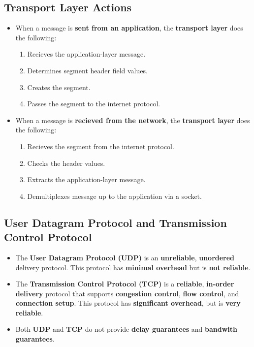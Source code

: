 \documentclass{article}
\begin{document}
    \subsection*{Transport Layer Actions}
    \begin{itemize}
        \item When a message is \textbf{sent from an application}, the \textbf{transport layer} does the following:
        \begin{enumerate}
            \item Recieves the application-layer message.
            \item Determines segment header field values.
            \item Creates the segment.
            \item Passes the segment to the internet protocol.
        \end{enumerate}
        \item When a message is \textbf{recieved from the network}, the \textbf{transport layer} does the following:
        \begin{enumerate}
            \item Recieves the segment from the internet protocol.
            \item Checks the header values.
            \item Extracts the application-layer message.
            \item Demultiplexes message up to the application via a socket.
        \end{enumerate}
    \end{itemize}

    \subsection*{User Datagram Protocol and Transmission Control Protocol}
    \begin{itemize}
        \item The \textbf{User Datagram Protocol (UDP)} is an \textbf{unreliable}, \textbf{unordered} delivery protocol. This protocol has \textbf{minimal overhead} but is \textbf{not reliable}.
        \item The \textbf{Transmission Control Protocol (TCP)} is a \textbf{reliable}, \textbf{in-order delivery} protocol that supports \textbf{congestion control}, \textbf{flow control}, and \textbf{connection setup}. This protocol has \textbf{significant overhead}, but is \textbf{very reliable}.
        \item Both \textbf{UDP} and \textbf{TCP} do not provide \textbf{delay guarantees} and \textbf{bandwith guarantees}.
    \end{itemize}
\end{document}

